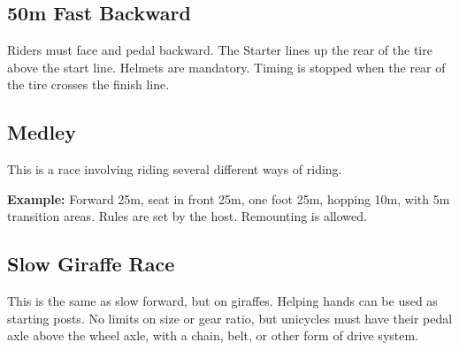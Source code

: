 \subsection{50m Fast Backward}
Riders must face and pedal backward.
The Starter lines up the rear of the tire above the start line.
Helmets are mandatory.
Timing is stopped when the rear of the tire crosses the finish line.

\subsection{Medley}
This is a race involving riding several different ways of riding.

\textbf{Example:} Forward 25m, seat in front 25m, one foot 25m, hopping 10m, with 5m transition areas.
Rules are set by the host.
Remounting is allowed.

\subsection{Slow Giraffe Race}
This is the same as slow forward, but on giraffes.
Helping hands can be used as starting posts.
No limits on size or gear ratio, but unicycles must have their pedal axle above the wheel axle, with a chain, belt, or other form of drive system.